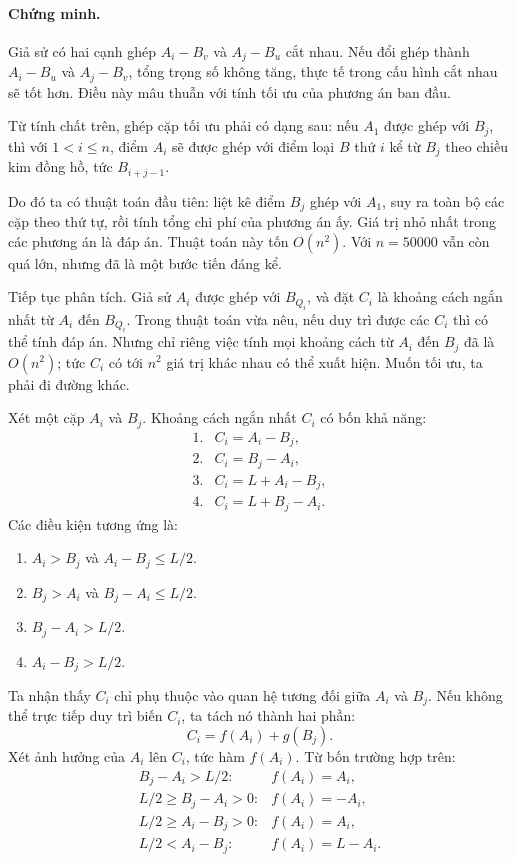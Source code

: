\documentclass[11pt]{article}
\begin{document}
\paragraph{Chứng minh.}
Giả sử có hai cạnh ghép $A_i-B_v$ và $A_j-B_u$ cắt nhau. Nếu đổi ghép thành
$A_i-B_u$ và $A_j-B_v$, tổng trọng số không tăng, thực tế trong cấu hình cắt
nhau sẽ tốt hơn. Điều này mâu thuẫn với tính tối ưu của phương án ban đầu.

Từ tính chất trên, ghép cặp tối ưu phải có dạng sau: nếu $A_1$ được ghép với
$B_j$, thì với $1<i\le n$, điểm $A_i$ sẽ được ghép với điểm loại $B$ thứ $i$
kể từ $B_j$ theo chiều kim đồng hồ, tức $B_{i+j-1}$.

Do đó ta có thuật toán đầu tiên: liệt kê điểm $B_j$ ghép với $A_1$, suy ra
toàn bộ các cặp theo thứ tự, rồi tính tổng chi phí của phương án ấy. Giá trị
nhỏ nhất trong các phương án là đáp án. Thuật toán này tốn $O(n^2)$. Với
$n=50000$ vẫn còn quá lớn, nhưng đã là một bước tiến đáng kể.

Tiếp tục phân tích. Giả sử $A_i$ được ghép với $B_{Q_i}$, và đặt $C_i$ là
khoảng cách ngắn nhất từ $A_i$ đến $B_{Q_i}$. Trong thuật toán vừa nêu, nếu
duy trì được các $C_i$ thì có thể tính đáp án. Nhưng chỉ riêng việc tính mọi
khoảng cách từ $A_i$ đến $B_j$ đã là $O(n^2)$; tức $C_i$ có tới $n^2$ giá trị
khác nhau có thể xuất hiện. Muốn tối ưu, ta phải đi đường khác.

Xét một cặp $A_i$ và $B_j$. Khoảng cách ngắn nhất $C_i$ có bốn khả năng:
\[
\begin{array}{ll}
1. & C_i=A_i-B_j,\\
2. & C_i=B_j-A_i,\\
3. & C_i=L+A_i-B_j,\\
4. & C_i=L+B_j-A_i.
\end{array}
\]
Các điều kiện tương ứng là:
\begin{enumerate}
  \item $A_i>B_j$ và $A_i-B_j\le L/2$.
  \item $B_j>A_i$ và $B_j-A_i\le L/2$.
  \item $B_j-A_i>L/2$.
  \item $A_i-B_j>L/2$.
\end{enumerate}

Ta nhận thấy $C_i$ chỉ phụ thuộc vào quan hệ tương đối giữa $A_i$ và $B_j$.
Nếu không thể trực tiếp duy trì biến $C_i$, ta tách nó thành hai phần:
\[
  C_i=f(A_i)+g(B_j).
\]
Xét ảnh hưởng của $A_i$ lên $C_i$, tức hàm $f(A_i)$. Từ bốn trường hợp trên:
\[
\begin{array}{ll}
B_j-A_i>L/2: & f(A_i)=A_i,\\
L/2\ge B_j-A_i>0: & f(A_i)=-A_i,\\
L/2\ge A_i-B_j>0: & f(A_i)=A_i,\\
L/2<A_i-B_j: & f(A_i)=L-A_i.
\end{array}
\]
\end{document}
